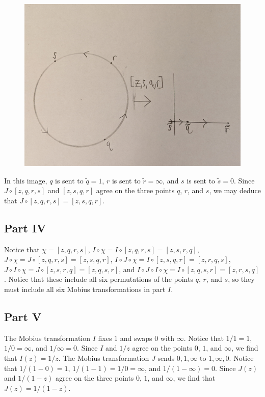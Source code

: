 \documentclass[12pt]{article}
\begin{document}
\begin{figure}[H]
\centering
\includegraphics[width=\textwidth]{Problem16Image5}
\end{figure}
\noindent In this image, $q$ is sent to $\tilde{q} = 1$, $r$ is sent to $\tilde{r} = \infty$, and $s$ is sent to $\tilde{s} = 0$. Since $J \circ [z,q,r,s]$ and $[z,s,q,r]$ agree on the three points $q$, $r$, and $s$, we may deduce that $J \circ [z,q,r,s] = [z,s,q,r]$.
\subsection*{Part IV}
Notice that $\chi = [z,q,r,s]$, $I \circ \chi = I \circ [z,q,r,s] = [z,s,r,q]$, $J \circ \chi = J \circ [z,q,r,s] = [z,s,q,r]$, $I \circ J \circ \chi = I \circ [z,s,q,r] = [z,r,q,s]$, $J \circ I \circ \chi = J \circ [z,s,r,q] = [z,q,s,r]$, and $I \circ J \circ I \circ \chi = I \circ [z,q,s,r] = [z,r,s,q]$. Notice that these include all six permutations of the points $q$, $r$, and $s$, so they must include all six Mobius transformations in part $I$.
\subsection*{Part V}
The Mobius transformation $I$ fixes $1$ and swaps $0$ with $\infty$. Notice that $1/1 = 1$, $1/0 = \infty$, and $1/\infty = 0$. Since $I$ and $1/z$ agree on the points $0$, $1$, and $\infty$, we find that $I(z) = 1/z$. The Mobius transformation $J$ sends $0,1,\infty$ to $1,\infty,0$. Notice that $1/(1-0) = 1$, $1/(1-1) = 1/0 = \infty$, and $1/(1-\infty) = 0$. Since $J(z)$ and $1/(1-z)$ agree on the three points $0$, $1$, and $\infty$, we find that $J(z) = 1/(1-z)$.
\end{document}
